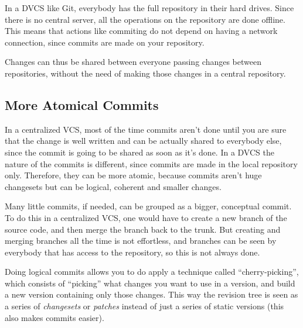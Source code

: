 \documentclass[%
	final,
	notitlepage,
	narroweqnarray,
	inline,
	twoside,
	]{ieee}
\begin{document}
In a DVCS like Git, everybody has the full repository in their hard drives.
Since there is no central server, all the operations on the repository are done 
offline. This means that actions like commiting do not depend on having a 
network connection, since commits are made on your repository.

Changes can thus be shared between everyone passing changes between repositories, 
without the need of making those changes in a central repository.



\subsection{More Atomical Commits}

In a centralized VCS, most of the time commits aren't done until you are sure that 
the change is well written and can be actually shared to everybody else, since the 
commit is going to be shared as soon as it's done. In a DVCS the nature of the commits 
is different, since commits are made in the local repository only. Therefore, they can be more atomic, 
because commits aren't huge changesets but can be logical, coherent and smaller changes. 

Many little commits, if needed, can be grouped as a bigger, conceptual commit.
To do this in a centralized VCS, one would have to create a new branch of the source code, 
and then merge the branch back to the trunk. But creating and merging branches all the time is 
not effortless, and branches can be seen by everybody that has access to the repository, 
so this is not always done.

Doing logical commits allows you to do apply a technique called ``cherry-picking'', 
which consists of ``picking'' what changes you want to use in a version, and build 
a new version containing only those changes. This way the revision tree is seen as a 
series of \emph{changesets} or \emph{patches} instead of just a series of static versions
(this also makes commits easier).
\end{document}
